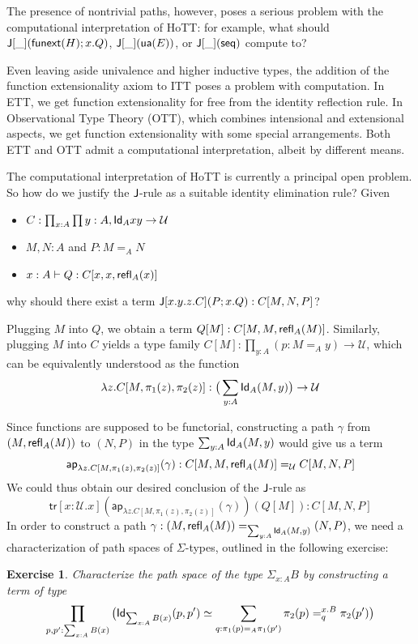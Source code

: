 \documentclass[12pt]{article}
\newcommand{\ap}{\mathsf{ap}}
\newcommand{\tr}{\mathsf{tr}}
\newcommand{\seq}{\mathsf{seq}}
\newtheorem*{exercise}{Exercise}
\begin{document}
The presence of nontrivial paths, however, poses a serious problem with the computational interpretation of HoTT: for example, what should $\mathsf{J}[\_](\mathsf{funext}(H);x.Q)$, $\mathsf{J}[\_](\mathsf{ua}(E))$, or $\J[\_](\seq)$ compute to? 

Even leaving aside univalence and higher inductive types, the addition of the function extensionality axiom to ITT poses a problem with computation. In ETT, we get function extensionality for free from the identity reflection rule. In Observational Type Theory (OTT), which combines intensional and extensional aspects, we get function extensionality with some special arrangements. Both ETT and OTT admit a computational interpretation, albeit by different means. 

The computational interpretation of HoTT is currently a principal open problem. So how do we justify the $\mathsf{J}$-rule as a suitable identity elimination rule? Given

\begin{itemize}
\item $C : \prod_{x : A} \prod{y : A}, \mathsf{Id}_{A}{x}{y} \to \mathcal{U}$
\item $M,N:A$ and $P:M=_A N$
\item $x:A\vdash Q:C[x,x,\mathsf{refl}_{A}(x)]$
\end{itemize}
why should there exist a term $\mathsf{J}[x.y.z.C](P;x.Q):C[M,N,P]$?

Plugging $M$ into $Q$, we obtain a term $Q[M]:C[M,M,\mathsf{refl}_{A}(M)]$. Similarly, plugging $M$ into $C$ yields a type family $C[M] : \prod_{y:A}(p:M=_A y)\to\mathcal{U}$, which can be equivalently understood as the function \[\lambda z. C[M, \pi_1(z), \pi_2(z)] : \big(\sum_{y:A} \mathsf{Id}_{A}(M,y)\big)\to\mathcal{U} \]

Since functions are supposed to be functorial, constructing a path $\gamma$ from $(M,\mathsf{refl}_{A}(M))$ to $(N,P)$ in the type $\sum_{y:A} \mathsf{Id}_{A}(M,y)$ would give us a term
\[ \ap_{\lambda z. C[M, \pi_1(z), \pi_2(z)]}(\gamma) : C[M,M,\refl{A}(M)] =_\mathcal{U} C[M,N,P] \]
We could thus obtain our desired conclusion of the $\mathsf{J}$-rule as \[ \tr[x : \mathcal{U}.x](\ap_{\lambda z. C[M, \pi_1(z), \pi_2(z)]}(\gamma))(Q[M]) : C[M,N,P]\]
In order to construct a path {\small $\gamma : (M,\mathsf{refl}_{A}(M)) =_{\sum_{y:A} \mathsf{Id}_{A}(M,y)} (N,P)$}, we need a characterization of path spaces of $\Sigma$-types, outlined in the following exercise:

\begin{exercise} Characterize the path space of the type $\Sigma_{x:A} B$ by constructing a term of type
\small {\[ \prod_{p,p':\sum_{x:A}B(x)} \big( \mathsf{Id}_{\sum_{x:A}B(x)}(p,p')\simeq\sum_{q:\pi_1(p)=_A\pi_1(p')}\pi_2(p) =^{x.B}_q \pi_2(p') \big) \]}
\end{exercise}
\end{document}

